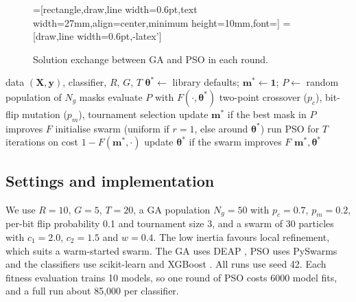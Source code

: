 \documentclass[conference]{IEEEtran}
\begin{document}
\begin{figure}[t]
\centering
{}=[rectangle,draw,line width=0.6pt,text width=27mm,align=center,minimum height=10mm,font=\scriptsize]
=[draw,line width=0.6pt,-latex']
\caption{Solution exchange between GA and PSO in each round.}
\label{fig:coop}
\end{figure}

\begin{algorithm}[t]
\caption{Cooperative GA--PSO}
\label{alg:coop}
\begin{algorithmic}[1]
\REQUIRE data $(\mathbf{X},\mathbf{y})$, classifier, $R$, $G$, $T$
\STATE $\boldsymbol{\theta}^{*}\leftarrow$ library defaults; $\mathbf{m}^{*}\leftarrow\mathbf{1}$; $P\leftarrow$ random population of $N_g$ masks
  \STATE evaluate $P$ with $F(\cdot,\boldsymbol{\theta}^{*})$
    \STATE two-point crossover ($p_c$), bit-flip mutation ($p_m$), tournament selection
  \ENDFOR
  \STATE update $\mathbf{m}^{*}$ if the best mask in $P$ improves $F$
  \STATE initialise swarm (uniform if $r=1$, else around $\boldsymbol{\theta}^{*}$)
  \STATE run PSO for $T$ iterations on cost $1-F(\mathbf{m}^{*},\cdot)$
  \STATE update $\boldsymbol{\theta}^{*}$ if the swarm improves $F$
\ENDFOR
\RETURN $\mathbf{m}^{*},\boldsymbol{\theta}^{*}$
\end{algorithmic}
\end{algorithm}

\subsection{Settings and implementation}
We use $R=10$, $G=5$, $T=20$, a GA population $N_g=50$ with $p_c=0.7$, $p_m=0.2$, per-bit flip probability 0.1 and tournament size 3, and a swarm of 30 particles with $c_1=2.0$, $c_2=1.5$ and $w=0.4$. The low inertia favours local refinement, which suits a warm-started swarm. The GA uses DEAP \cite{fortin2012deap}, PSO uses PySwarms \cite{miranda2018pyswarms} and the classifiers use scikit-learn \cite{pedregosa2011sklearn} and XGBoost \cite{chen2016xgboost}. All runs use seed 42. Each fitness evaluation trains 10 models, so one round of PSO costs 6000 model fits, and a full run about 85{,}000 per classifier.
\end{document}
